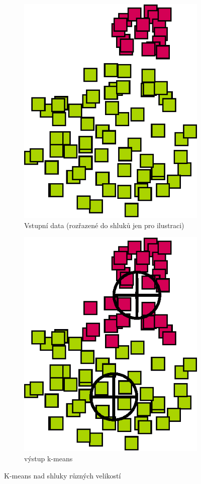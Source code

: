 \begin{figure}[h]
\centering
\begin{subfigure}{.49\textwidth}
  \centering
  \includegraphics[width=.5\linewidth]{img/kmeans_badInputSampleSize.eps}
  \caption{Vstupní data (rozřazené do shluků jen pro ilustraci)}
  \label{fig:kmeansbadinputsize}
\end{subfigure}
\begin{subfigure}{.49\textwidth}
  \centering
  \includegraphics[width=.5\linewidth]{img/kmeans_badOutputSampleSize.eps}
  \caption{výstup k-means}
  \label{fig:kmeansbadoutputsize}
\end{subfigure}
\caption{K-means nad shluky různých velikostí}
\end{figure}


